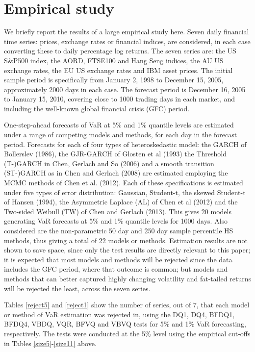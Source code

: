 \documentclass[12pt,epsf]{article}
\begin{document}
\section{Empirical study}
We briefly report the results of a large empirical study here. Seven daily financial time series: prices, exchange rates or
financial indices, are considered, in each case converting these to daily percentage log returns. The seven series are: the US
S\&P500 index, the AORD, FTSE100 and Hang Seng indices, the AU US exchange rates, the EU US exchange rates and IBM asset prices.
The initial sample period is specifically from January 2, 1998 to December 15, 2005, approximately 2000 days in each case. The forecast
period is December 16, 2005 to January 15, 2010, covering close to 1000 trading days in each market, and including the well-known
global financial crisis (GFC) period.

One-step-ahead forecasts of VaR at 5\% and 1\% quantile levels are estimated under a range of competing models and methods, for each day in
the forecast period. Forecasts for each of four types of heteroskedastic model: the GARCH of Bollerslev (1986), the GJR-GARCH of
Glosten et al (1993) the Threshold (T-)GARCH in Chen, Gerlach and So (2006) and a smooth transition (ST-)GARCH as in Chen and Gerlach (2008)
are estimated employing the MCMC methods of Chen et al. (2012). Each of these specifications is estimated under five types of error
distribution: Gaussian, Student-t, the skewed Student-t of Hansen (1994), the Asymmetric Laplace (AL) of Chen et al (2012) and the
Two-sided Weibull (TW) of Chen and Gerlach (2013). This gives 20 models generating VaR forecasts at 5\% and 1\% quantile levels for 1000 days.
Also considered are the non-parametric 50 day and 250 day sample percentile HS methods, thus giving a total of 22 models or methods.
Estimation results are not shown to save space, since only the test results are directly relevant to this paper; it is expected that most models
and methods will be rejected since the data includes the GFC period, where that outcome is common;
but models and methods that can better captured highly changing volatility and fat-tailed returns will be rejected the least,
across the seven series.

Tables \ref{reject5} and \ref{reject1} show the number of series, out of 7, that each model or method of VaR estimation was rejected in,
using the DQ1, DQ4, BFDQ1, BFDQ4, VBDQ, VQR, BFVQ and VBVQ tests for 5\% and 1\% VaR forecasting, respectively.
The tests were conducted at the 5\% level using the empirical cut-offs in Tables \ref{size5}-\ref{size11} above.
\end{document}
